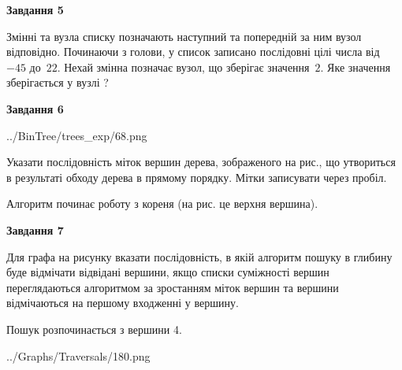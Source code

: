 \documentclass[12pt, ukrainian]{article}
\begin{document}
{\begin {large}
{\begin {center}\textbf{Завдання 5}\end {center}}\par
Змінні  та  вузла списку позначають наступний та попередній за ним вузол відповідно. Починаючи з голови, у список записано послідовні цілі числа від~$-45$ до~$22$. Нехай змінна  позначає вузол, що зберігає значення~$2$.
Яке значення зберігається у вузлі  ?\par
\newpage

{\begin {center}\textbf{Завдання 6}\end {center}}\par

\begin{center}
	{../BinTree/trees_exp/68.png}
\end{center}
Указати послідовність міток вершин дерева, зображеного на рис., що утвориться в результаті обходу дерева в прямому порядку. Мітки записувати через пробіл.\par Алгоритм починає роботу з кореня (на рис. це верхня вершина).\par
\newpage

{\begin {center}\textbf{Завдання 7}\end {center}}\par
Для графа на рисунку вказати послідовність, в якій алгоритм пошуку в глибину буде відмічати відвідані вершини, якщо списки суміжності вершин переглядаються алгоритмом за зростанням міток вершин та вершини відмічаються на першому вход\-женні у вершину.\par
Пошук розпочинається з вершини 4.\par

\begin{center}
	{../Graphs/Traversals/180.png}
\end{center}\par
\newpage


\end{large}}
\end{document}
